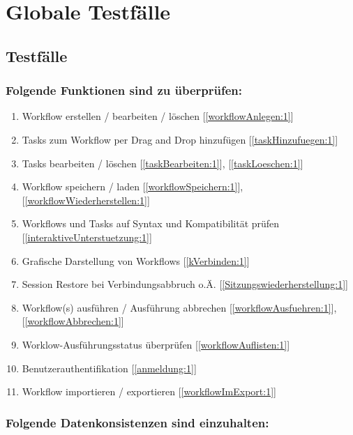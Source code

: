 

\chapter{Globale Testfälle}
    \section{Testfälle}
        \subsection{Folgende Funktionen sind zu überprüfen:}
        \begin{enumerate}[font={\bfseries}, label=TF{\arabic*}0, wide=0pt, labelindent=1em, leftmargin=*]
            
            \item \label{TWEdit} Workflow erstellen / bearbeiten / löschen [\ref{workflowAnlegen:1}]
            \item \label{TTAddW} Tasks zum Workflow per \Gls{Drag and Drop} hinzufügen [\ref{taskHinzufuegen:1}]
            \item \label{TTEdit} Tasks bearbeiten / löschen [\ref{taskBearbeiten:1}], [\ref{taskLoeschen:1}]
            \item \label{TWSave} Workflow speichern / laden [\ref{workflowSpeichern:1}], [\ref{workflowWiederherstellen:1}]
            \item Workflows und Tasks auf Syntax und Kompatibilität prüfen [\ref{interaktiveUnterstuetzung:1}]
            \item Grafische Darstellung von Workflows [\ref{kVerbinden:1}]
            \item \label{TSessioRestore} Session Restore bei Verbindungsabbruch o.Ä. [\ref{Sitzungswiederherstellung:1}]
            \item \label{TExec} Workflow(s) ausführen / Ausführung abbrechen [\ref{workflowAusfuehren:1}], [\ref{workflowAbbrechen:1}]
            \item \label{TStatus} Worklow-Ausführungsstatus überprüfen [\ref{workflowAuflisten:1}]
            \item \label{Tlogin} Benutzerauthentifikation [\ref{anmeldung:1}]
            \item Workflow importieren / exportieren [\ref{workflowImExport:1}]
        \end{enumerate}
        
        \subsection{Folgende Datenkonsistenzen sind einzuhalten:}
        
